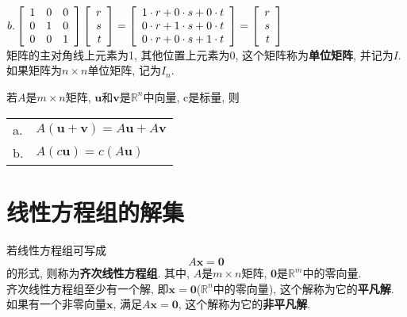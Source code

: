 $\displaystyle b.\left[\begin{array}{r r r}
	1 & 0 & 0\\
	0 & 1 & 0\\
	0 & 0 & 1
    \end{array}\right]
    \left[\begin{array}{r}
        r\\
	s\\
	t
    \end{array}\right]=
    \left[\begin{array}{r}
        1\cdot r+0\cdot s+0\cdot t\\
	0\cdot r+1\cdot s+0\cdot t\\
	0\cdot r+0\cdot s+1\cdot t
    \end{array}\right]=
    \left[\begin{array}{r}
	r\\
	s\\
	t
    \end{array}\right]$\\[2ex]

矩阵的主对角线上元素为1, 其他位置上元素为0, 这个矩阵称为\textbf{单位矩阵}, 并记为$I$.\\
如果矩阵为$n\times n$单位矩阵, 记为$I_n$.\\[2ex]

\begin{TheoremOne}
若$A$是$m\times n$矩阵, $\bm{u}$和$\bm{v}$是$\mathbb{R}^n$中向量, c是标量, 则\\
\begin{tabular}{l@{\,}l}
a. & $A(\bm{u}+\bm{v})=A\bm{u}+A\bm{v}$\\
b. & $A(c\bm{u})=c(A\bm{u})$
\end{tabular}
\end{TheoremOne}\vspace{6ex}

\section{线性方程组的解集}
若线性方程组可写成
\[A\bm{x}=\bm{0}\]
的形式, 则称为\textbf{齐次线性方程组}. 其中, $A$是$m\times n$矩阵, $\bm{0}$是$\mathbb{R}^m$中的零向量.\\
齐次线性方程组至少有一个解, 即$\bm{x}=\bm{0}$($\mathbb{R}^n$中的零向量), 这个解称为它的\textbf{平凡解}.\\
如果有一个非零向量$\bm{x}$, 满足$A\bm{x}=\bm{0}$, 这个解称为它的\textbf{非平凡解}.\\[2ex]

